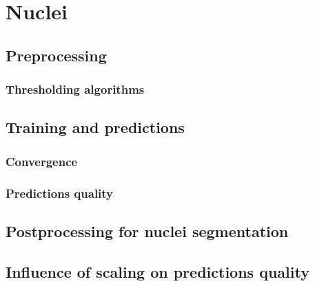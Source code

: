 \section{Nuclei}
    \subsection{Preprocessing}
        \subsubsection{Thresholding algorithms}
    \subsection{Training and predictions}
        \subsubsection{Convergence}
        \subsubsection{Predictions quality}
    \subsection{Postprocessing for nuclei segmentation}
    \subsection{Influence of scaling on predictions quality}